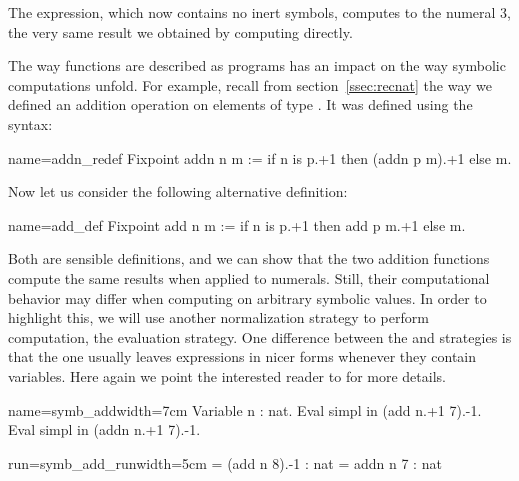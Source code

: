 The expression, which now contains no inert symbols, computes to the numeral 3,
the very same result we obtained by computing 
directly.


The way functions are described as programs has an impact on the way
symbolic computations unfold. For example, recall from
section~\ref{ssec:recnat} the way we defined an addition operation on
elements of type . It was defined using the  syntax: %

\begin{coq}{name=addn_redef}{}
Fixpoint addn n m := if n is p.+1 then (addn p m).+1 else m.
\end{coq}

Now let us consider the following alternative definition:

\begin{coq}{name=add_def}{}
Fixpoint add n m := if n is p.+1 then add p m.+1 else m.
\end{coq}

Both are sensible definitions, and we can show that the two addition
functions compute the same results when applied to numerals.  Still,
their computational behavior may differ when computing on arbitrary
symbolic values. In order to highlight this, we will use another
normalization strategy to perform computation, the 
evaluation strategy.  One difference between the 
and  strategies is that the  one usually leaves
expressions in nicer forms whenever they contain variables. Here again
we point the interested reader to \cite[section
5.3.7, ``Performing computations'']{Coq:manual} for
more details.

\begin{coq-left}{name=symb_add}{width=7cm}
Variable n : nat.
Eval simpl in (add  n.+1 7).-1.
Eval simpl in (addn n.+1 7).-1.
\end{coq-left}
\begin{coqout-right}{run=symb_add_run}{width=5cm}
= (add n 8).-1 : nat
= addn n 7 : nat
\end{coqout-right}

